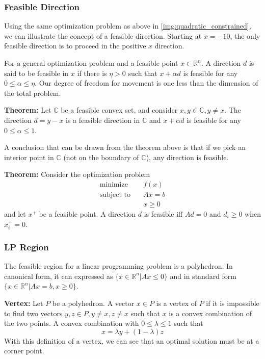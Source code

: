 \subsubsection{Feasible Direction}
Using the same optimization problem as above in \ref{img:quadratic_constrained}, we can illustrate the concept of a feasible direction.
Starting at $x=-10$, the only feasible direction is to proceed in the positive $x$ direction.

For a general optimization problem and a feasible point $x \in \mathbb{R}^n$.
A direction $d$ is said to be feasible in $x$ if there is $\eta > 0$ such that $x + \alpha d$ is feasible for any $0 \leq \alpha \leq \eta$.
Our degree of freedom for movement is one less than the dimension of the total problem. 

\textbf{Theorem: } Let $\mathbb{C}$ be a feasible convex set, and consider $x,y \in \mathbb{C}, y \neq x$.
The direction $d= y-x$ is a feasible direction in $\mathbb{C}$ and $x +\alpha d$ is feasible for any $0 \leq \alpha \leq 1$.

A conclusion that can be drawn from the theorem above is that if we pick an interior point in $\mathbb{C}$ (not on the boundary of $\mathbb{C}$), any direction is feasible.

\textbf{Theorem: } Consider the optimization problem
\begin{align}
  \text{minimize} & \quad f(x) \\
  \text{subject to} & \quad Ax = b \\
  & \quad x \geq 0
\end{align}
and let $x^+$ be a feasible point. 
A direction $d$ is feasible iff $Ad = 0$ and $ d_i \geq 0$ when $x_i^+ = 0$.
\subsubsection{LP Region}
The feasible region for a linear programming problem is a polyhedron.
In canonical form, it can expressed as $\{ x \in \mathbb{R}^n | Ax \leq 0 \}$ and in standard form $ \{ x \in \mathbb{R}^n | Ax = b, x \geq 0 \}$.

\textbf{Vertex: } Let $P$ be a polyhedron. 
A vector $x \in P$ is a vertex of $P$ if it is impossible to find two vectors $y, z \in P, y\neq x, z \neq x$ such that $x$ is a convex combination of the two points.
A convex combination with $0 \leq \lambda \leq 1$ such that
\begin{equation}
  x = \lambda y + (1-\lambda) z
\end{equation}
With this definition of a vertex, we can see that an optimal solution must be at a corner point.

